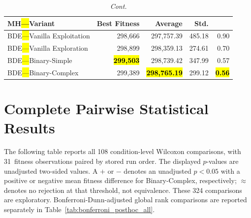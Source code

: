 \documentclass[mathematics,article,accept,moreauthors]{Definitions/mdpi}
\begin{document}
\begin{table}[H]\ContinuedFloat
\caption{\textit{Cont.}}
  \small
  \label{tab:calidad_mknapcb9_29}
  \begin{tabularx}{\textwidth}{lRRRR}
    \toprule
    \textbf{MH\hl{---}Variant} &
    \textbf{Best Fitness} &
    \textbf{Average} &
    \textbf{Std.} &
    \textbf{} \\
    \midrule



    BDE\hl{---}Vanilla Exploitation  &         298,666 &        297,757.39 & 485.18 &         0.90 \\
    BDE\hl{---}Vanilla Exploration   &         298,899 &        298,359.13 & 274.61 &         0.70 \\
    BDE\hl{---}Binary-Simple         & \textbf{\hl{299,503}} &        298,739.42 & 347.99 &         0.57 \\
    BDE\hl{---}Binary-Complex        &         299,389 & \textbf{\hl{298,765.19}} & 299.12 & \textbf{\hl{0.56}} \\
    \bottomrule
  \end{tabularx}
\end{table}

\section{Complete Pairwise Statistical Results}
\label{sec:appendix_statistics}

The following table reports all 108 condition-level Wilcoxon comparisons,
with 31~fitness observations paired by stored run order. The displayed
$p$-values are unadjusted two-sided values. A $+$ or $-$ denotes an
unadjusted $p<0.05$ with a positive or negative mean fitness difference
for Binary-Complex, respectively; $\approx$ denotes no rejection at
that threshold, not equivalence. These 324 comparisons are exploratory.
Bonferroni-Dunn-adjusted global rank comparisons are reported separately
in Table~\ref{tab:bonferroni_posthoc_all}.
\end{document}
